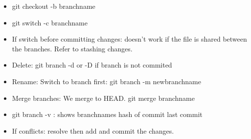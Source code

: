 \documentclass[landscape,a0paper,fontscale=0.285]{baposter} %
\newcommand{\compresslist}{ %
\setlength{\itemsep}{1pt}
\setlength{\parskip}{0pt}
\setlength{\parsep}{0pt}
}
\begin{document}
{\begin{poster}
{\begin{itemize}
\end{itemize}

\colorbox[HTML]{A3C1AD}{}
\begin{itemize}\compresslist
\item git checkout -b branchname


\item git switch -c branchname

\item If switch before committing changes: doesn’t work if the file is shared between the branches. Refer to stashing changes. 

\end{itemize}


\colorbox[HTML]{A3C1AD}{}
\begin{itemize}\compresslist
\item Delete:
git branch -d or -D if branch is not commited
\item Rename:
Switch to branch first: git branch -m newbranchname
\item Merge branches:
We merge to HEAD.
git merge branchname
\item 
git branch -v : shows branchnames hash of commit last commit
\item If conflicts: resolve then add and commit the changes.


\end{itemize}



}
\end{poster}}
\end{document}

